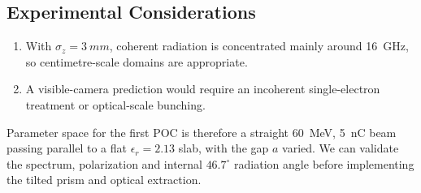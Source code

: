 \documentclass[a4paper,11pt]{article}
\begin{document}
\subsection{Experimental Considerations}
\begin{enumerate}
\item With $\sigma_z=\SI{3}{mm}$, coherent radiation is concentrated mainly around \SI{16}{GHz}, so centimetre-scale domains are appropriate.  

\item A visible-camera prediction would require an incoherent single-electron treatment or optical-scale bunching.  

\end{enumerate}

Parameter space for the first POC is therefore a straight \SI{60}{MeV}, \SI{5}{nC} beam passing parallel to a flat $\epsilon_r=2.13$ slab, with the gap $a$ varied.  We can validate the spectrum, polarization and internal $46.7^\circ$ radiation angle before implementing the tilted prism and optical extraction.
\end{document}
